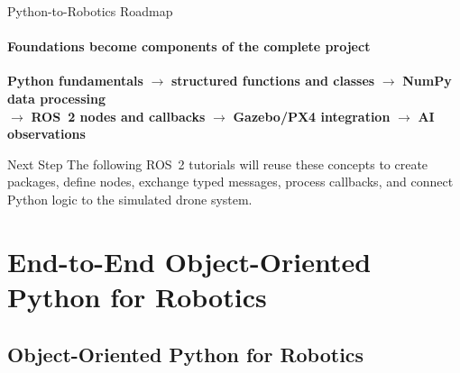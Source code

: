 \begin{frame}{Python-to-Robotics Roadmap}
\framesubtitle{Foundations become components of the complete project}
\begin{center}
\textbf{Python fundamentals}
\(\rightarrow\)
\textbf{structured functions and classes}
\(\rightarrow\)
\textbf{NumPy data processing}\\[0.5em]
\(\rightarrow\)
\textbf{ROS~2 nodes and callbacks}
\(\rightarrow\)
\textbf{Gazebo/PX4 integration}
\(\rightarrow\)
\textbf{AI observations}
\end{center}
\pause
\begin{exampleblock}{Next Step}
The following ROS~2 tutorials will reuse these concepts to create packages, define nodes, exchange typed messages, process callbacks, and connect Python logic to the simulated drone system.
\end{exampleblock}
\end{frame}



\section{End-to-End Object-Oriented Python for Robotics}

\subsection{Object-Oriented Python for Robotics}

